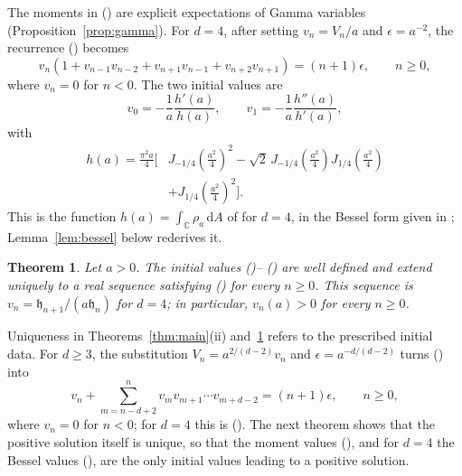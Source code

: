 \documentclass[twoside,10pt]{article}
\numberwithin{equation}{section}
\theoremstyle{slbody}
\newtheorem{theorem}{Theorem}[section]
\theoremstyle{remark}
\newcommand{\C}{\mathbb C}
\newcommand{\dd}{\,\mathrm d}
\newcommand{\fh}{\mathfrak h}
\renewcommand{\eqref}[1]{%
  \textup{{\normalfont(\oldstylenums{\ref{#1}}}\normalfont)}}
\begin{document}
The moments in \eqref{eq:FH-initial} are explicit expectations of
Gamma variables (Proposition~\ref{prop:gamma}).  For \(d=4\), after
setting \(v_n=V_n/a\) and \(\epsilon=a^{-2}\), the recurrence
\eqref{eq:FH-recurrence} becomes
\begin{equation}
v_n\left(
1+v_{n-1}v_{n-2}
+v_{n+1}v_{n-1}
+v_{n+2}v_{n+1}
\right)
=(n+1)\epsilon ,
\qquad n\geq0,
\label{eq:quartic-recurrence}
\end{equation}
where \(v_n=0\) for \(n<0\).  The two initial values are
\begin{equation}
v_0=-\frac1a\frac{h'(a)}{h(a)},
\qquad
v_1=-\frac1a\frac{h''(a)}{h'(a)},
\label{eq:initial-values}
\end{equation}
with
\begin{equation}
\begin{split}
h(a)=\frac{\pi^2a}{4}\bigg[
&J_{-1/4}\left(\frac{a^2}{4}\right)^2
-\sqrt2\,J_{-1/4}\left(\frac{a^2}{4}\right)
J_{1/4}\left(\frac{a^2}{4}\right)\\
&+J_{1/4}\left(\frac{a^2}{4}\right)^2
\bigg].
\end{split}
\label{eq:h-bessel}
\end{equation}
This is the function \(h(a)=\int_\C\rho_a\dd A\) of
\cite[equation~(3.4)]{FelderHoppe2025} for \(d=4\), in the Bessel form
given in \cite[Section~4]{FelderHoppe2025}; Lemma~\ref{lem:bessel}
below rederives it.

\begin{theorem}\label{thm:quartic}
Let \(a>0\).  The initial values
\eqref{eq:initial-values}--\eqref{eq:h-bessel} are well defined and
extend uniquely to a real sequence satisfying
\eqref{eq:quartic-recurrence} for every \(n\geq0\).  This sequence is
\(v_n=\fh_{n+1}/(a\fh_n)\) for \(d=4\); in particular, \(v_n(a)>0\) for
every \(n\geq0\).
\end{theorem}

Uniqueness in Theorems~\ref{thm:main}(ii) and~\ref{thm:quartic} refers
to the prescribed initial data.  For \(d\geq3\), the substitution
\(V_n=a^{2/(d-2)}v_n\) and \(\epsilon=a^{-d/(d-2)}\) turns
\eqref{eq:FH-recurrence} into
\begin{equation}
v_n+\sum_{m=n-d+2}^{n}v_mv_{m+1}\cdots v_{m+d-2}=(n+1)\epsilon,
\qquad n\geq0,
\label{eq:general-recurrence}
\end{equation}
where \(v_n=0\) for \(n<0\); for \(d=4\) this is
\eqref{eq:quartic-recurrence}.  The next theorem shows that the positive
solution itself is unique, so that the moment values
\eqref{eq:FH-initial}, and for \(d=4\) the Bessel values
\eqref{eq:initial-values}, are the only initial values leading to a
positive solution.
\end{document}
